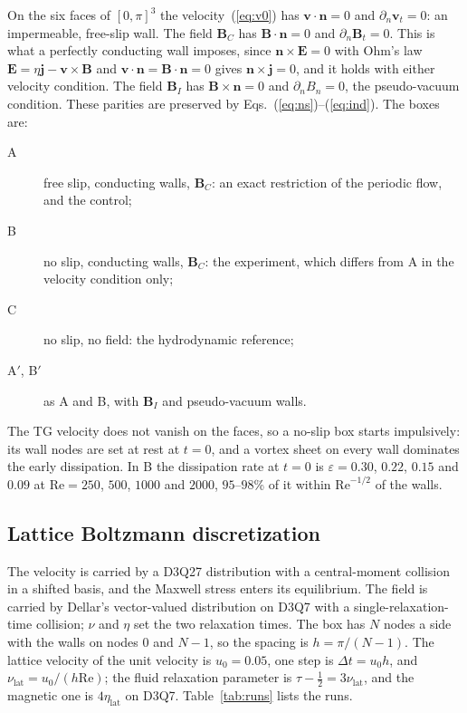 \documentclass[aip,pop,reprint,amsmath,amssymb,superscriptaddress,floatfix]{revtex4-2}
\newcommand{\Rey}{\mathrm{Re}}
\newcommand{\vv}{\bm{v}}
\newcommand{\BB}{\bm{B}}
\newcommand{\eps}{\varepsilon}
\begin{document}
On the six faces of $[0,\pi]^3$ the velocity~(\ref{eq:v0}) has $\vv\cdot\bm{n}=0$ and
$\partial_n\vv_t=0$: an impermeable, free-slip wall. The field $\BB_C$ has
$\BB\cdot\bm{n}=0$ and $\partial_n\BB_t=0$. This is what a perfectly conducting wall
imposes, since $\bm{n}\times\bm{E}=0$ with Ohm's law
$\bm{E}=\eta\bm{j}-\vv\times\BB$ and $\vv\cdot\bm{n}=\BB\cdot\bm{n}=0$ gives
$\bm{n}\times\bm{j}=0$, and it holds with either velocity condition. The field $\BB_I$
has $\BB\times\bm{n}=0$ and $\partial_n B_n=0$, the pseudo-vacuum condition. These
parities are preserved by Eqs.~(\ref{eq:ns})--(\ref{eq:ind}). The boxes are:
\begin{description}
\item[A] free slip, conducting walls, $\BB_C$: an exact restriction of the periodic
flow, and the control;
\item[B] no slip, conducting walls, $\BB_C$: the experiment, which differs from A in
the velocity condition only;
\item[C] no slip, no field: the hydrodynamic reference;
\item[A$'$, B$'$] as A and B, with $\BB_I$ and pseudo-vacuum walls.
\end{description}
The TG velocity does not vanish on the faces, so a no-slip box starts impulsively: its
wall nodes are set at rest at $t=0$, and a vortex sheet on every wall dominates the
early dissipation. In B the dissipation rate at $t=0$ is $\eps=0.30$, $0.22$, $0.15$
and $0.09$ at $\Rey=250$, $500$, $1000$ and $2000$, $95$--$98$\% of it within
$\Rey^{-1/2}$ of the walls.

\subsection{Lattice Boltzmann discretization}

The velocity is carried by a D3Q27 distribution with a central-moment collision in a
shifted basis,\cite{geier2006,derosis2018} and the Maxwell stress enters its
equilibrium.\cite{dellar2002} The field is carried by Dellar's vector-valued
distribution\cite{dellar2002} on D3Q7 with a single-relaxation-time collision; $\nu$
and $\eta$ set the two relaxation times.\cite{kruger2017} The box has $N$ nodes a side
with the walls on nodes $0$ and $N-1$, so the spacing is $h=\pi/(N-1)$. The lattice
velocity of the unit velocity is $u_0=0.05$, one step is $\Delta t=u_0h$, and
$\nu_{\mathrm{lat}}=u_0/(h\Rey)$; the fluid relaxation parameter is
$\tau-\tfrac12=3\nu_{\mathrm{lat}}$, and the magnetic one is $4\eta_{\mathrm{lat}}$
on D3Q7. Table~\ref{tab:runs} lists the runs.
\end{document}
